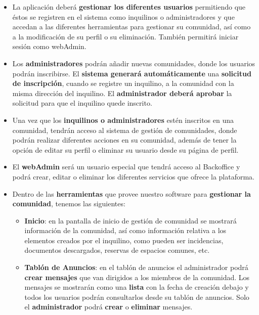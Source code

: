 \begin{itemize}
	\item La aplicación deberá \textbf{gestionar los diferentes usuarios} permitiendo que éstos se registren en el sistema como inquilinos o administradores y que accedan a las diferentes herramientas para gestionar su comunidad, así como a la modificación de su perfil o su eliminación. También permitirá iniciar sesión como webAdmin.
	
 	\item Los \textbf{administradores} podrán añadir nuevas comunidades, donde los usuarios podrán inscribirse. El \textbf{sistema generará automáticamente} una \textbf{solicitud de inscripción}, cuando se registre un inquilino, a la comunidad con la misma dirección del inquilino. El \textbf{administrador deberá aprobar} la solicitud para que el inquilino quede inscrito.
 	
 	\item Una vez que los \textbf{inquilinos o administradores} estén inscritos en una comunidad, tendrán acceso al sistema de gestión de comunidades, donde podrán realizar diferentes acciones en su comunidad, además de tener la opción de editar su perfil o eliminar su usuario desde su página de perfil. 
 	
 	\item El \textbf{webAdmin} será un usuario especial que tendrá acceso al Backoffice y podrá crear, editar o eliminar los diferentes servicios que ofrece la plataforma.
 	
 	\item Dentro de las \textbf{herramientas} que provee nuestro software para \textbf{gestionar la comunidad}, tenemos las siguientes:
 	
 	\begin{itemize}
 		\item \textbf{Inicio}: en la pantalla de inicio de gestión de comunidad se mostrará información de la comunidad, así como información relativa a los elementos creados por el inquilino, como pueden ser incidencias, documentos descargados, reservas de espacios comunes, etc.
 		
 		\item \textbf{Tablón de Anuncios}: en el tablón de anuncios el administrador podrá \textbf{crear mensajes} que van dirigidos a los miembros de la comunidad. Los mensajes se mostrarán como una \textbf{lista} con la fecha de creación debajo y todos los usuarios podrán consultarlos desde su tablón de anuncios. Solo el \textbf{administrador} podrá \textbf{crear} o \textbf{eliminar} mensajes. 
 		

\end{itemize}
\end{itemize}
